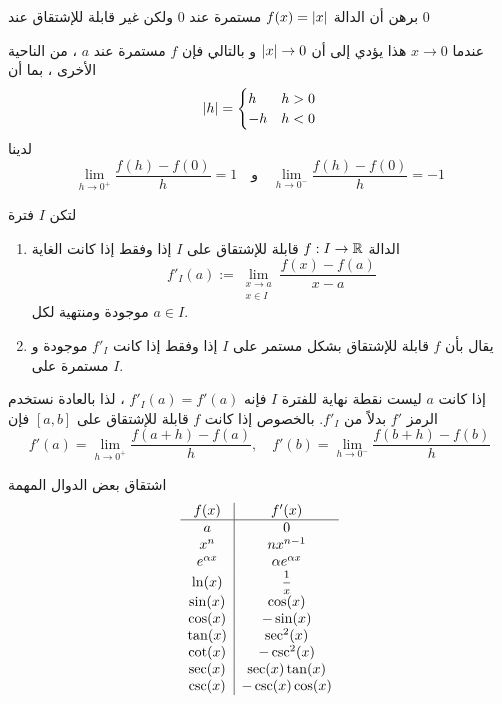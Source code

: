\begin{example}
    برهن أن الدالة $f(x)=\abs{x}$ مستمرة عند $0$ ولكن غير قابلة للإشتقاق عند $0$
\end{example}
\begin{myproof}
    عندما $x\to0$ هذا يؤدي إلى أن $\abs{x}\to0$ و بالتالي فإن $f$ مستمرة عند $a$ ، من الناحية الأخرى ، بما أن
   \[
   \abs{h}=\begin{cases}
       h & h>0\\
      -h & h<0
  \end{cases}
   \]
    لدينا
    \[
    \lim\limits_{h\rightarrow0^+}\frac{f(h)-f(0)}{h}=1\quad\text{و}\quad\lim\limits_{h\rightarrow0^-}\frac{f(h)-f(0)}{h}=-1
    \]
\end{myproof}
\begin{definition}
    لتكن $I$ فترة
    \begin{enumerate}
        \item الدالة $f:I\to\R$ قابلة للإشتقاق على $I$ إذا وفقط إذا كانت الغاية
        \[
        f'_I(a):=\lim_{\substack{x\to a \\ x\in I}}\frac{f(x)-f(a)}{x-a}
        \]
        موجودة ومنتهية لكل $a\in I$.

        \item يقال بأن $f$ قابلة للإشتقاق بشكل مستمر على $I$ إذا وفقط إذا كانت $f'_I$ موجودة و مستمرة على $I$.
    \end{enumerate}
\end{definition}

\begin{note}
  إذا كانت $a$ ليست نقطة نهاية للفترة $I$ فإنه $f'_I(a)=f'(a)$ ، لذا بالعادة نستخدم الرمز $f'$ بدلاً من $f'_I$. بالخصوص إذا كانت $f$ قابلة للإشتقاق على $[a,b]$ فإن
  \[
  f'(a)=\lim\limits_{h\to0^+}\frac{f(a+h)-f(a)}{h},\quad f'(b)=\lim\limits_{h\to0^-}\frac{f(b+h)-f(b)}{h}
  \]
\end{note}

\begin{note}
    اشتقاق بعض الدوال المهمة 
\[
\begin{array}{c|c}
f(x) & f'(x) \\
\hline
a & 0\\
x^n & nx^{n-1} \\
e^{\alpha x} & \alpha e^{\alpha x} \\
\ln(x) & \mfrac{1}{x} \\
\sin(x) & \cos(x) \\
\cos(x) & -\sin(x) \\
\tan(x) & \sec^2(x) \\
\cot(x) & -\csc^2(x) \\
\sec(x) & \sec(x) \tan(x) \\
\csc(x) & -\csc(x) \cos(x) \\
\end{array}
\]
\end{note}

